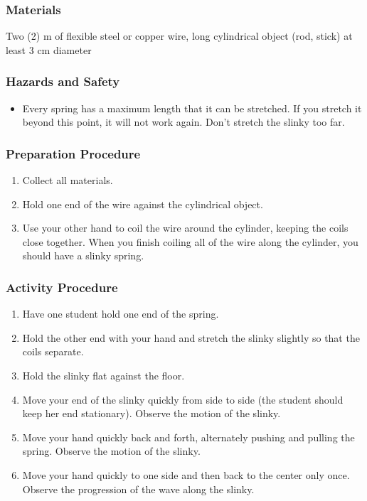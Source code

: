 \subsubsection*{Materials}
Two (2) m of flexible steel or copper wire, long cylindrical object (rod, stick) at least 3 cm diameter

\subsubsection*{Hazards and Safety}
\begin{itemize}
\item{Every spring has a maximum length that it can be stretched. If you stretch it beyond this point, it will not work again. Don't stretch the slinky too far.} 
\end{itemize}

\subsubsection*{Preparation Procedure}
\begin{enumerate}
\item{Collect all materials.} 
\item{Hold one end of the wire against the cylindrical object.} 
\item{Use your other hand to coil the wire around the cylinder, keeping the coils close together. When you finish coiling all of the wire along the cylinder, you should have a slinky spring.} 
\end{enumerate}

\subsubsection*{Activity Procedure}
\begin{enumerate}
\item{Have one student hold one end of the spring.} 
\item{Hold the other end with your hand and stretch the slinky slightly so that the coils separate.} 
\item{Hold the slinky flat against the floor.} 
\item{Move your end of the slinky quickly from side to side (the student should keep her end stationary). Observe the motion of the slinky.} 
\item{Move your hand quickly back and forth, alternately pushing and pulling the spring. Observe the motion of the slinky.} 
\item{Move your hand quickly to one side and then back to the center only once. Observe the progression of the wave along the slinky.} 
\end{enumerate}

